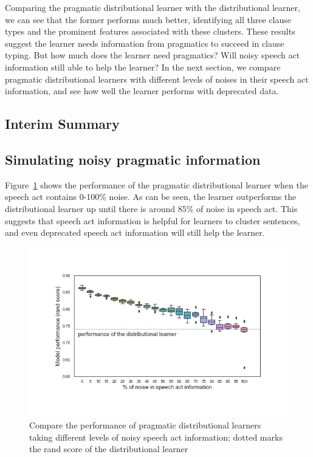 Comparing the pragmatic distributional learner with the distributional learner, we can see that the former performs much better, identifying all three clause types and the prominent features associated with these clusters. These results suggest the learner needs information from pragmatics to succeed in clause typing. But how much does the learner need pragmatics? Will noisy speech act information still able to help the learner? In the next section, we compare pragmatic distributional learners with different levels of noises in their speech act information, and see how well the learner performs with deprecated data.


\subsection{Interim Summary}
\label{sec:engcl:model:results:summary}

\subsection{Simulating noisy pragmatic information} 
\label{sec:engcl:model:noisy}


Figure~\ref{fig:noisy-rand-compare} shows the performance of the pragmatic distributional learner when the speech act contains 0-100\% noise. As can be seen, the learner outperforms the distributional learner up until there is around 85\% of noise in speech act. This suggests that speech act information is helpful for learners to cluster sentences, and even deprecated speech act information will still help the learner.  

\begin{figure}[H]
    \centering
    \includegraphics[width=1\textwidth]{figures/noisy-rand-compare.jpg}
    \caption{Compare the performance of pragmatic distributional learners taking different levels of noisy speech act information; dotted marks the rand score of the distributional learner}
    \label{fig:noisy-rand-compare}
\end{figure}

